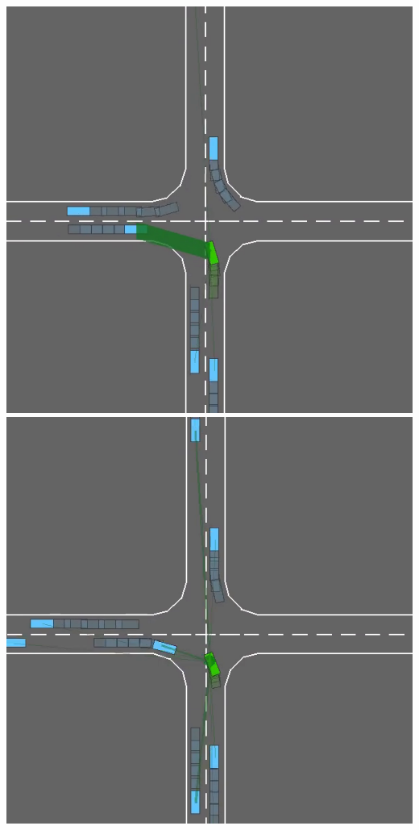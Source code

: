\documentclass[paperwidth=36in,paperheight=48in,portrait,fontscale=0.3, margin=2cm]{baposter}
\begin{document}
\begin{poster}
{\begin{center}
\begin{minipage}[b]{0.28\textwidth}
\end{minipage}
\begin{minipage}[b]{0.42\textwidth}
	\includegraphics[width=0.49\linewidth]{../img/watch1}
	\includegraphics[width=0.49\linewidth]{../img/watch2}
\end{minipage}


\end{center}}
\end{poster}
\end{document}
